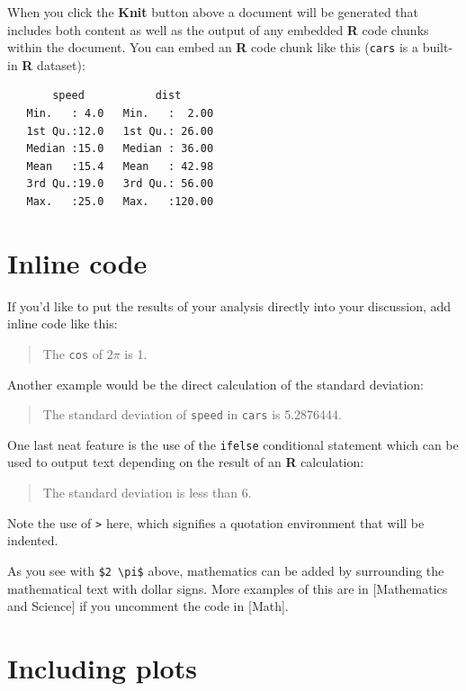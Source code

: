\documentclass[12pt,phd,a4paper,twoside]{ucl_thesis}
\begin{document}
  When you click the \textbf{Knit} button above a document will be generated that includes both content as well as the output of any embedded \textbf{R} code chunks within the document. You can embed an \textbf{R} code chunk like this (\texttt{cars} is a built-in \textbf{R} dataset):
  \begin{Shaded}
  \begin{Highlighting}[]
  \end{Highlighting}
  \end{Shaded}
  \begin{verbatim}
       speed           dist       
   Min.   : 4.0   Min.   :  2.00  
   1st Qu.:12.0   1st Qu.: 26.00  
   Median :15.0   Median : 36.00  
   Mean   :15.4   Mean   : 42.98  
   3rd Qu.:19.0   3rd Qu.: 56.00  
   Max.   :25.0   Max.   :120.00  
  \end{verbatim}
  \hypertarget{inline-code}{%
  \section{Inline code}\label{inline-code}}
  
  If you'd like to put the results of your analysis directly into your discussion, add inline code like this:
  \begin{quote}
  The \texttt{cos} of \(2 \pi\) is 1.
  \end{quote}
  Another example would be the direct calculation of the standard deviation:
  \begin{quote}
  The standard deviation of \texttt{speed} in \texttt{cars} is 5.2876444.
  \end{quote}
  One last neat feature is the use of the \texttt{ifelse} conditional statement which can be used to output text depending on the result of an \textbf{R} calculation:
  \begin{quote}
  The standard deviation is less than 6.
  \end{quote}
  Note the use of \texttt{\textgreater{}} here, which signifies a quotation environment that will be indented.
  
  As you see with \texttt{\$2\ \textbackslash{}pi\$} above, mathematics can be added by surrounding the mathematical text with dollar signs. More examples of this are in {[}Mathematics and Science{]} if you uncomment the code in {[}Math{]}.
  
  \hypertarget{including-plots}{%
  \section{Including plots}\label{including-plots}}
  
\end{document}
